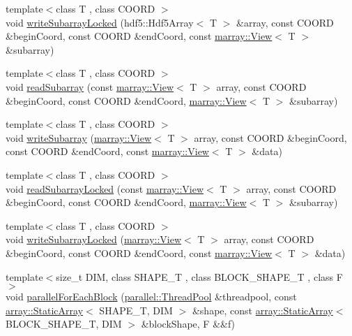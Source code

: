 \begin{DoxyCompactItemize}
\item 
{\footnotesize template$<$class T , class C\+O\+O\+R\+D $>$ }\\void \hyperlink{namespacenifty_1_1tools_a102fca55b5880c5b398205f0b438fbfe}{write\+Subarray\+Locked} (hdf5\+::\+Hdf5\+Array$<$ T $>$ \&array, const C\+O\+O\+R\+D \&begin\+Coord, const C\+O\+O\+R\+D \&end\+Coord, const \hyperlink{classandres_1_1View}{marray\+::\+View}$<$ T $>$ \&subarray)
\item 
{\footnotesize template$<$class T , class C\+O\+O\+R\+D $>$ }\\void \hyperlink{namespacenifty_1_1tools_ab1a49786aa1d421ff8801c6659ada142}{read\+Subarray} (const \hyperlink{classandres_1_1View}{marray\+::\+View}$<$ T $>$ array, const C\+O\+O\+R\+D \&begin\+Coord, const C\+O\+O\+R\+D \&end\+Coord, \hyperlink{classandres_1_1View}{marray\+::\+View}$<$ T $>$ \&subarray)
\item 
{\footnotesize template$<$class T , class C\+O\+O\+R\+D $>$ }\\void \hyperlink{namespacenifty_1_1tools_ace36c8be6273f83864c4b1b261eb25d3}{write\+Subarray} (\hyperlink{classandres_1_1View}{marray\+::\+View}$<$ T $>$ array, const C\+O\+O\+R\+D \&begin\+Coord, const C\+O\+O\+R\+D \&end\+Coord, const \hyperlink{classandres_1_1View}{marray\+::\+View}$<$ T $>$ \&data)
\item 
{\footnotesize template$<$class T , class C\+O\+O\+R\+D $>$ }\\void \hyperlink{namespacenifty_1_1tools_ad9c06ed1bf5a27481583971a28bf9142}{read\+Subarray\+Locked} (const \hyperlink{classandres_1_1View}{marray\+::\+View}$<$ T $>$ array, const C\+O\+O\+R\+D \&begin\+Coord, const C\+O\+O\+R\+D \&end\+Coord, \hyperlink{classandres_1_1View}{marray\+::\+View}$<$ T $>$ \&subarray)
\item 
{\footnotesize template$<$class T , class C\+O\+O\+R\+D $>$ }\\void \hyperlink{namespacenifty_1_1tools_a0d4355b32819ca638b88af283797bc92}{write\+Subarray\+Locked} (\hyperlink{classandres_1_1View}{marray\+::\+View}$<$ T $>$ array, const C\+O\+O\+R\+D \&begin\+Coord, const C\+O\+O\+R\+D \&end\+Coord, const \hyperlink{classandres_1_1View}{marray\+::\+View}$<$ T $>$ \&data)
\item 
{\footnotesize template$<$size\+\_\+t D\+I\+M, class S\+H\+A\+P\+E\+\_\+\+T , class B\+L\+O\+C\+K\+\_\+\+S\+H\+A\+P\+E\+\_\+\+T , class F $>$ }\\void \hyperlink{namespacenifty_1_1tools_ac5e8d4b06486a3d603cdbb7314f8dd75}{parallel\+For\+Each\+Block} (\hyperlink{classnifty_1_1parallel_1_1ThreadPool}{parallel\+::\+Thread\+Pool} \&threadpool, const \hyperlink{namespacenifty_1_1array_a683f151f19c851754e0c6d55ed16a0c2}{array\+::\+Static\+Array}$<$ S\+H\+A\+P\+E\+\_\+\+T, D\+I\+M $>$ \&shape, const \hyperlink{namespacenifty_1_1array_a683f151f19c851754e0c6d55ed16a0c2}{array\+::\+Static\+Array}$<$ B\+L\+O\+C\+K\+\_\+\+S\+H\+A\+P\+E\+\_\+\+T, D\+I\+M $>$ \&block\+Shape, F \&\&f)

\end{DoxyCompactItemize}
